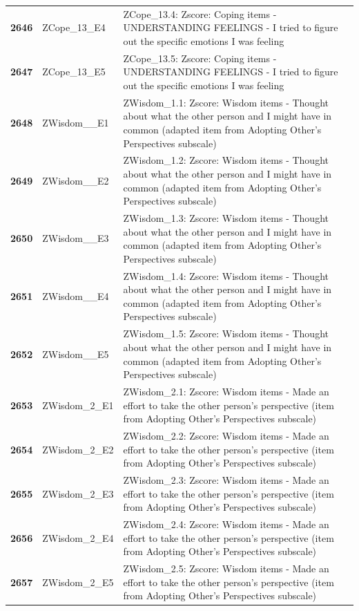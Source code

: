 \documentclass[
  letterpaper,
  DIV=11,
  numbers=noendperiod]{scrartcl}
\begin{document}
\begin{longtable}[t]{>{}cll}
\addlinespace
\textbf{2646} & ZCope\_13\_E4 & ZCope\_13.4: Zscore:  Coping items - UNDERSTANDING FEELINGS - I tried to figure out the specific emotions I was feeling\\
\textbf{2647} & ZCope\_13\_E5 & ZCope\_13.5: Zscore:  Coping items - UNDERSTANDING FEELINGS - I tried to figure out the specific emotions I was feeling\\
\textbf{2648} & ZWisdom\_\_E1 & ZWisdom\_1.1: Zscore:  Wisdom items - Thought about what the other person and I might have in common (adapted item from Adopting Other's Perspectives subscale)\\
\textbf{2649} & ZWisdom\_\_E2 & ZWisdom\_1.2: Zscore:  Wisdom items - Thought about what the other person and I might have in common (adapted item from Adopting Other's Perspectives subscale)\\
\textbf{2650} & ZWisdom\_\_E3 & ZWisdom\_1.3: Zscore:  Wisdom items - Thought about what the other person and I might have in common (adapted item from Adopting Other's Perspectives subscale)\\
\addlinespace
\textbf{2651} & ZWisdom\_\_E4 & ZWisdom\_1.4: Zscore:  Wisdom items - Thought about what the other person and I might have in common (adapted item from Adopting Other's Perspectives subscale)\\
\textbf{2652} & ZWisdom\_\_E5 & ZWisdom\_1.5: Zscore:  Wisdom items - Thought about what the other person and I might have in common (adapted item from Adopting Other's Perspectives subscale)\\
\textbf{2653} & ZWisdom\_2\_E1 & ZWisdom\_2.1: Zscore:  Wisdom items - Made an effort to take the other person's perspective (item from Adopting Other's Perspectives subscale)\\
\textbf{2654} & ZWisdom\_2\_E2 & ZWisdom\_2.2: Zscore:  Wisdom items - Made an effort to take the other person's perspective (item from Adopting Other's Perspectives subscale)\\
\textbf{2655} & ZWisdom\_2\_E3 & ZWisdom\_2.3: Zscore:  Wisdom items - Made an effort to take the other person's perspective (item from Adopting Other's Perspectives subscale)\\
\addlinespace
\textbf{2656} & ZWisdom\_2\_E4 & ZWisdom\_2.4: Zscore:  Wisdom items - Made an effort to take the other person's perspective (item from Adopting Other's Perspectives subscale)\\
\textbf{2657} & ZWisdom\_2\_E5 & ZWisdom\_2.5: Zscore:  Wisdom items - Made an effort to take the other person's perspective (item from Adopting Other's Perspectives subscale)\\

\end{longtable}
\end{document}
